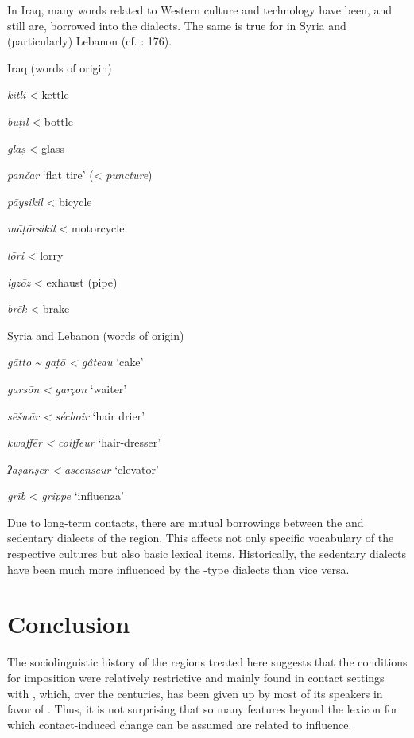 \documentclass[output=paper]{langsci/langscibook}
\begin{document}
In Iraq, many  words related to Western culture and technology have been, and still are, borrowed into the dialects. The same is true for  in Syria and (particularly) Lebanon (cf. \citealt{Barbot1961}: 176).

\ea
Iraq (words of  origin)

\textit{kitli} < kettle 

\textit{buṭil} < bottle

\textit{glāṣ} < glass

\textit{pančar} ‘flat tire’ (< \textit{puncture})

\textit{pāysikil} < bicycle

\textit{māṭōrsikil} < motorcycle

\textit{lōri} < lorry 

\textit{igzōz} < exhaust (pipe)

\textit{brēk} < brake
\z

\ea
Syria and Lebanon (words of  origin)

\textit{gātto} \textit{{\textasciitilde} gaṭō < gâteau} ‘cake’

\textit{garsōn} \textit{<} \textit{garçon} ‘waiter’

\textit{sēšwār} \textit{<} \textit{séchoir} ‘hair drier’

\textit{kwaffēr} \textit{<} \textit{coiffeur} ‘hair-dresser’

\textit{ʔaṣanṣēr} \textit{<} \textit{ascenseur} ‘elevator’

\textit{grīb} < \textit{grippe} ‘influenza’
\z

Due to long-term contacts, there are mutual borrowings between the  and sedentary dialects of the region. This affects not only specific vocabulary of the respective cultures but also basic lexical items. Historically, the sedentary dialects have been much more influenced by the -type dialects than vice versa. 

\section{Conclusion} 

The sociolinguistic history of the regions treated here suggests that the conditions for {imposition} were relatively restrictive and mainly found in contact settings with , which, over the centuries, has been given up by most of its speakers in favor of . Thus, it is not surprising that so many features beyond the lexicon for which contact-induced change can be assumed are related to  influence. 
\end{document}
